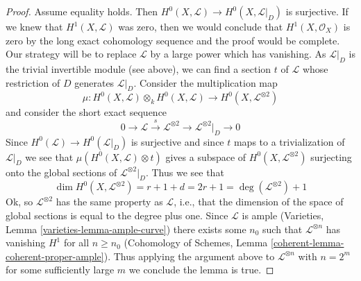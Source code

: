 \begin{proof}
\medskip\noindent
Assume equality holds. Then
$H^0(X, \mathcal{L}) \to H^0(X, \mathcal{L}|_D)$ is surjective.
If we knew that $H^1(X, \mathcal{L})$ was zero, then we would
conclude that $H^1(X, \mathcal{O}_X)$ is zero by the long exact
cohomology sequence and the proof would
be complete. Our strategy will be to replace $\mathcal{L}$ by a
large power which has vanishing. As $\mathcal{L}|_D$ is the
trivial invertible module (see above), we can
find a section $t$ of $\mathcal{L}$ whose restriction
of $D$ generates $\mathcal{L}|_D$.
Consider the multiplication map
$$
\mu :
H^0(X, \mathcal{L}) \otimes_k H^0(X, \mathcal{L})
\longrightarrow
H^0(X, \mathcal{L}^{\otimes 2})
$$
and consider the short exact sequence
$$
0 \to \mathcal{L} \xrightarrow{s}
\mathcal{L}^{\otimes 2} \to \mathcal{L}^{\otimes 2}|_D \to 0
$$
Since $H^0(\mathcal{L}) \to H^0(\mathcal{L}|_D)$ is surjective and since
$t$ maps to a trivialization of $\mathcal{L}|_D$ we see that
$\mu(H^0(X, \mathcal{L}) \otimes t)$ gives a subspace of
$H^0(X, \mathcal{L}^{\otimes 2})$ surjecting onto the global sections of
$\mathcal{L}^{\otimes 2}|_D$. Thus we see that
$$
\dim H^0(X, \mathcal{L}^{\otimes 2}) = r + 1 + d = 2r + 1 =
\deg(\mathcal{L}^{\otimes 2}) + 1
$$
Ok, so $\mathcal{L}^{\otimes 2}$ has the same property as $\mathcal{L}$, i.e.,
that the dimension of the space of global sections is equal to the
degree plus one. Since $\mathcal{L}$ is ample
(Varieties, Lemma \ref{varieties-lemma-ample-curve})
there exists some $n_0$ such that $\mathcal{L}^{\otimes n}$
has vanishing $H^1$ for all $n \geq n_0$
(Cohomology of Schemes, Lemma \ref{coherent-lemma-coherent-proper-ample}).
Thus applying the argument above to $\mathcal{L}^{\otimes n}$
with $n = 2^m$ for some sufficiently large $m$ we conclude the
lemma is true.
\end{proof}

